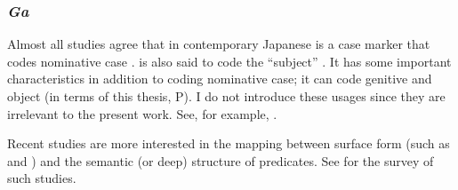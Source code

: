 \subsubsection{\textit{Ga}}

Almost all studies agree that
 in contemporary Japanese is a case marker that codes nominative case \cite[e.g.,][]{yamada36,kuno73,tanaka77,shibatani90}.
 is also said to code the ``subject'' \cite[e.g.,][p.~164]{kuroda79}.
It has some important characteristics in addition to coding nominative case;
it can code genitive and object (in terms of this thesis, P).
I do not introduce these usages since they are irrelevant to the present work.
See, for example, \cite{ono75,nishida77,yasuda77,kuno73,shibatani01}.

Recent studies are more interested in the mapping between
surface form (such as  and )
and the semantic (or deep) structure of predicates.
See  for the survey of such studies.


